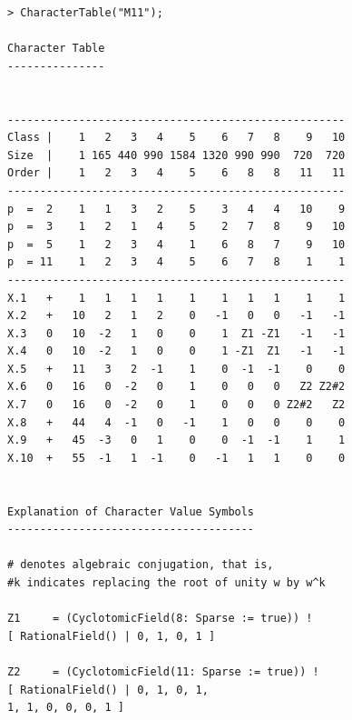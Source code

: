 \begin{lstlisting}
> CharacterTable("M11");

Character Table
---------------


----------------------------------------------------
Class |    1   2   3   4    5    6   7   8    9   10
Size  |    1 165 440 990 1584 1320 990 990  720  720
Order |    1   2   3   4    5    6   8   8   11   11
----------------------------------------------------
p  =  2    1   1   3   2    5    3   4   4   10    9
p  =  3    1   2   1   4    5    2   7   8    9   10
p  =  5    1   2   3   4    1    6   8   7    9   10
p  = 11    1   2   3   4    5    6   7   8    1    1
----------------------------------------------------
X.1   +    1   1   1   1    1    1   1   1    1    1
X.2   +   10   2   1   2    0   -1   0   0   -1   -1
X.3   0   10  -2   1   0    0    1  Z1 -Z1   -1   -1
X.4   0   10  -2   1   0    0    1 -Z1  Z1   -1   -1
X.5   +   11   3   2  -1    1    0  -1  -1    0    0
X.6   0   16   0  -2   0    1    0   0   0   Z2 Z2#2
X.7   0   16   0  -2   0    1    0   0   0 Z2#2   Z2
X.8   +   44   4  -1   0   -1    1   0   0    0    0
X.9   +   45  -3   0   1    0    0  -1  -1    1    1
X.10  +   55  -1   1  -1    0   -1   1   1    0    0


Explanation of Character Value Symbols
--------------------------------------

# denotes algebraic conjugation, that is,
#k indicates replacing the root of unity w by w^k

Z1     = (CyclotomicField(8: Sparse := true)) ! 
[ RationalField() | 0, 1, 0, 1 ]

Z2     = (CyclotomicField(11: Sparse := true)) ! 
[ RationalField() | 0, 1, 0, 1,
1, 1, 0, 0, 0, 1 ]    
\end{lstlisting}





